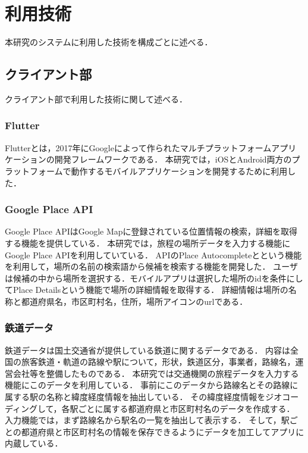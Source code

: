 \section{利用技術}

本研究のシステムに利用した技術を構成ごとに述べる．

\subsection{クライアント部}
クライアント部で利用した技術に関して述べる．

\subsubsection{Flutter}
Flutter\cite{Flutter}とは，2017年にGoogleによって作られたマルチプラットフォームアプリケーションの開発フレームワークである．
本研究では，iOSとAndroid両方のプラットフォームで動作するモバイルアプリケーションを開発するために利用した．

\subsubsection{Google Place API}
Google Place API\cite{GoogleMap}はGoogle Mapに登録されている位置情報の検索，詳細を取得する機能を提供している．
本研究では，旅程の場所データを入力する機能にGoogle Place APIを利用していている．
APIのPlace Autocompleteとという機能を利用して，場所の名前の検索語から候補を検索する機能を開発した．
ユーザは候補の中から場所を選択する．モバイルアプリは選択した場所のidを条件にしてPlace Detailsという機能で場所の詳細情報を取得する．
詳細情報は場所の名称と都道府県名，市区町村名，住所，場所アイコンのurlである．

\subsubsection{鉄道データ}
鉄道データ\cite{TrainData}は国土交通省が提供している鉄道に関するデータである．
内容は全国の旅客鉄道・軌道の路線や駅について，形状，鉄道区分，事業者，路線名，運営会社等を整備したものである．
本研究では交通機関の旅程データを入力する機能にこのデータを利用している．
事前にこのデータから路線名とその路線に属する駅の名称と緯度経度情報を抽出している．
その緯度経度情報をジオコーディングして，各駅ごとに属する都道府県と市区町村名のデータを作成する．
入力機能では，まず路線名から駅名の一覧を抽出して表示する．
そして，駅ごとの都道府県と市区町村名の情報を保存できるようにデータを加工してアプリに内蔵している．

